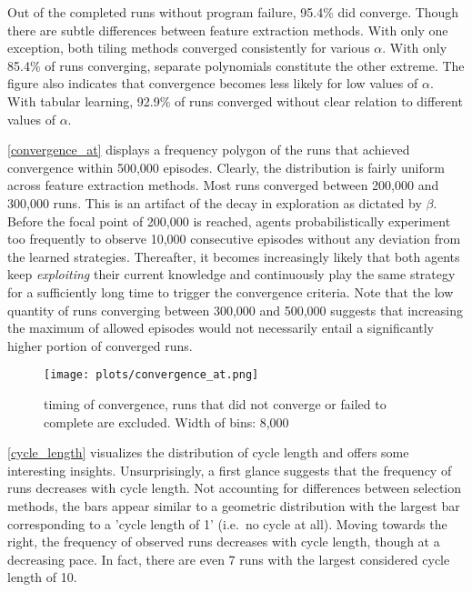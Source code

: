 Out of the completed runs without program failure, 95.4\% did converge. Though there are subtle differences between feature extraction methods. With only one exception, both tiling methods converged consistently for various $\alpha$. With only 85.4\% of runs converging, separate polynomials constitute the other extreme. The figure also indicates that convergence becomes less likely for low values of $\alpha$. With tabular learning, 92.9\% of runs converged without clear relation to different values of $\alpha$.

\autoref{convergence_at} displays a frequency polygon of the runs that achieved convergence within 500,000 episodes. Clearly, the distribution is fairly uniform across feature extraction methods. Most runs converged between 200,000 and 300,000 runs. This is an artifact of the decay in exploration as dictated by $\beta$. Before the focal point of 200,000 is reached, agents probabilistically experiment too frequently to observe 10,000 consecutive episodes without any deviation from the learned strategies. Thereafter, it becomes increasingly likely that both agents keep \emph{exploiting} their current knowledge and continuously play the same strategy for a sufficiently long time to trigger the convergence criteria. Note that the low quantity of runs converging between 300,000 and 500,000 suggests that increasing the maximum of allowed episodes would not necessarily entail a significantly higher portion of converged runs.

\begin{figure}
	\texttt{[image: plots/convergence\_at.png]}
	\caption{timing of convergence, runs that did not converge or failed to complete are excluded. Width of bins: 8,000}
	\label{convergence_at}
\end{figure}

\autoref{cycle_length} visualizes the distribution of cycle length and offers some interesting insights. Unsurprisingly, a first glance suggests that the frequency of runs decreases with cycle length. Not accounting for differences between selection methods, the bars appear similar to a geometric distribution with the largest bar corresponding to a 'cycle length of 1' (i.e.\ no cycle at all). Moving towards the right, the frequency of observed runs decreases with cycle length, though at a decreasing pace. In fact, there are even 7 runs with the largest considered cycle length of 10.

